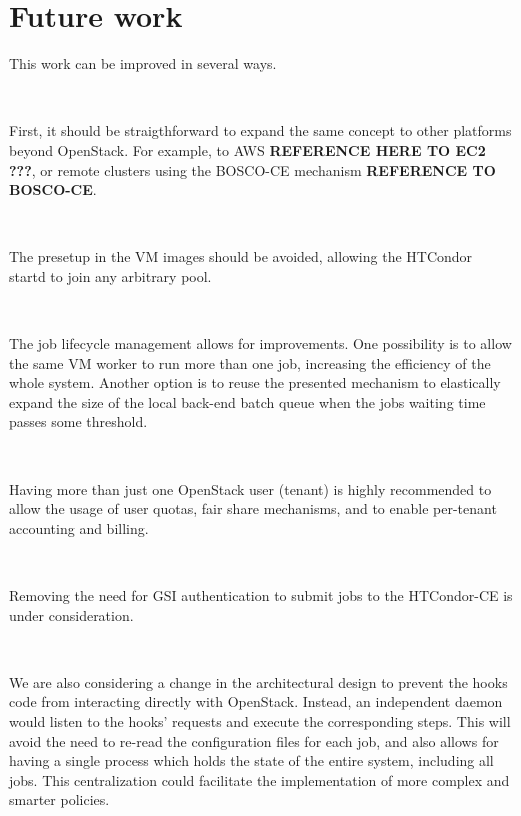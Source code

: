 \documentclass[a4paper]{jpconf}
\begin{document}
\section{Future work}

This work can be improved in several ways. 

~

First, it should be straigthforward to expand the same concept to other
platforms beyond OpenStack. For example, to AWS \textbf{REFERENCE HERE TO EC2
???}, or remote clusters using the BOSCO-CE mechanism \textbf{REFERENCE TO BOSCO-CE}.

~

The presetup in the VM images should be avoided, allowing the HTCondor startd to join any arbitrary pool.

~

The job lifecycle management allows for improvements. 
One possibility is to allow the same VM worker to run more than one job,
increasing the efficiency of the whole system. Another option is to reuse the
presented mechanism to elastically expand the size of the local back-end batch
queue when the jobs waiting time passes some threshold.

~

Having more than just one OpenStack user (tenant) is highly recommended to allow
the usage of user quotas, fair share mechanisms, and to enable per-tenant
accounting and billing.

~

Removing the need for GSI authentication to submit jobs to the HTCondor-CE is under consideration.

~

We are also considering a change in the architectural design to prevent the
hooks code from interacting directly with OpenStack. Instead, an independent
daemon would listen to the hooks' requests and execute the corresponding steps.
This will avoid the need to re-read the configuration files for each job, 
and also allows for having a single process which holds the state of the entire
system, including all jobs. This centralization could facilitate the
implementation of more complex and smarter policies.
 


\end{document}
